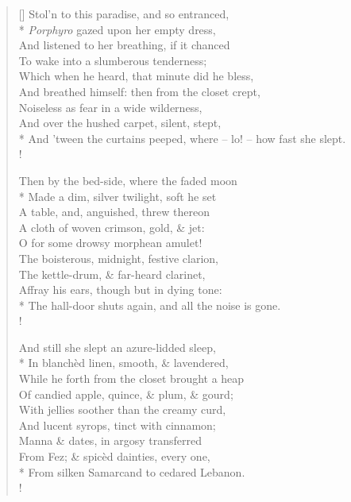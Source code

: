 \documentclass[MAIN]{subfiles}
\begin{document}
\begin{verse}[\versewidth]
\vin Stol'n to this paradise, and so entranced,\\*
\vin \emph{Porphyro} gazed upon her empty dress,\\
\vin And listened to her breathing, if it chanced\\
\vin To wake into a slumberous tenderness;\\
\vin Which when he heard, that minute did he bless,\\
\vin And breathed himself: then from the closet crept,\\
\vin Noiseless as fear in a wide wilderness,\\
\vin And over the hushed carpet, silent, stept,\\*
And 'tween the curtains peeped, where -- lo! -- how fast she slept.\\!

\vin Then by the bed-side, where the faded moon\\*
\vin Made a dim, silver twilight, soft he set\\
\vin A table, and,  anguished, threw thereon\\
\vin A cloth of woven crimson, gold, \& jet:\\
\vin O for some drowsy morphean amulet!\\
\vin The boisterous, midnight, festive clarion,\\
\vin The kettle-drum, \& far-heard clarinet,\\
\vin Affray his ears, though but in dying tone:\\*
The hall-door shuts again, and all the noise is gone.\\!

\vin And still she slept an azure-lidded sleep,\\*
\vin In blanch\`ed linen, smooth, \& lavendered,\\
\vin While he forth from the closet brought a heap\\
\vin Of candied apple, quince, \& plum, \& gourd;\\
\vin With jellies soother than the creamy curd,\\
\vin And lucent syrops, tinct with cinnamon;\\
\vin Manna \& dates, in argosy transferred\\
\vin From {\sc Fez}; \& spic\`ed dainties, every one,\\*
From silken {\sc Samarcand} to cedared Lebanon.\\!


\end{verse}
\end{document}
